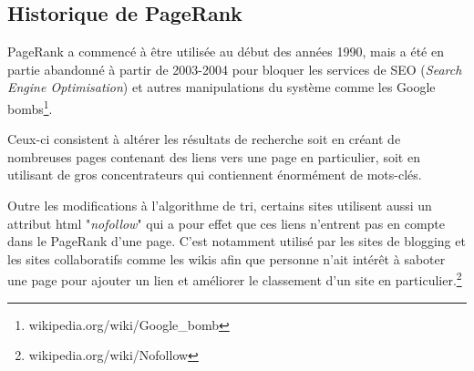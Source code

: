 \subsection*{Historique de PageRank}

	PageRank a commencé à être utilisée au début des années 1990, mais a été en partie abandonné à partir de 2003-2004 pour bloquer les services de SEO (\textit{Search Engine Optimisation}) et autres manipulations du système comme les Google bombs\footnote{wikipedia.org/wiki/Google\_bomb}.
	
	Ceux-ci consistent à altérer les résultats de recherche soit en créant de nombreuses pages contenant des liens vers une page en particulier, soit en utilisant de gros concentrateurs qui contiennent énormément de mots-clés.
	
	Outre les modifications à l'algorithme de tri, certains sites utilisent aussi un attribut html "\textit{nofollow}" qui a pour effet que ces liens n'entrent pas en compte dans le PageRank d'une page. C'est notamment utilisé par les sites de blogging et les sites collaboratifs comme les wikis afin que personne n'ait intérêt à saboter une page pour ajouter un lien et améliorer le classement d'un site en particulier.\footnote{wikipedia.org/wiki/Nofollow}

